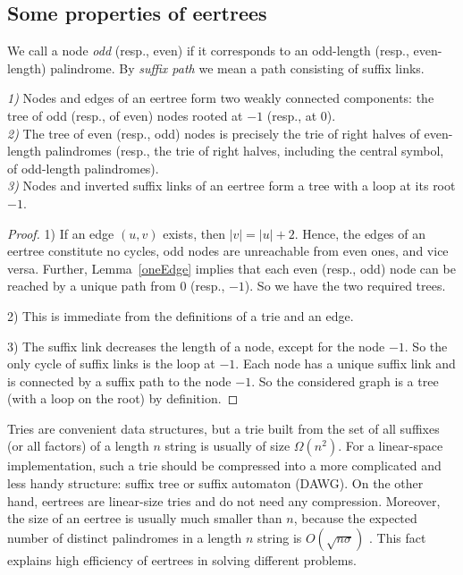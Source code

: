 \documentclass{llncs}
\begin{document}
\subsection{Some properties of eertrees} \label{ssec:prop}

We call a node \emph{odd} (resp., even) if it corresponds to an odd-length (resp., even-length) palindrome. By \emph{suffix path} we mean a path consisting of suffix links. 

\begin{lemma}\label{twotree}
\emph{1)} Nodes and edges of an eertree form two weakly connected components: the tree of odd (resp., of even) nodes rooted at $-1$ (resp., at $0$).\\
\emph{2)} The tree of even (resp., odd) nodes is precisely the trie of right halves of even-length palindromes (resp., the trie of right halves, including the central symbol, of odd-length palindromes).\\
\emph{3)} Nodes and inverted suffix links of an eertree form a tree with a loop at its root $-1$.
\end{lemma}

\begin{proof}
1) If an edge $(u,v)$ exists, then $|v|=|u|+2$. Hence, the edges of an eertree constitute no cycles, odd nodes are unreachable from even ones, and vice versa. Further, Lemma~\ref{oneEdge} implies that each even (resp., odd) node can be reached by a unique path from $0$ (resp., $-1$). So we have the two required trees.

2) This is immediate from the definitions of a trie and an edge.

3) The suffix link decreases the length of a node, except for the node $-1$. So the only cycle of suffix links is the loop at $-1$. Each node has a unique suffix link and is connected by a suffix path to the node $-1$. So the considered graph is a tree (with a loop on the root) by definition. 
\end{proof}



\begin{remark}
Tries are convenient data structures, but a trie built from the set of all suffixes (or all factors) of a length $n$ string is usually of size $\Omega(n^2)$. For a linear-space implementation, such a  trie should be compressed into a more complicated and less handy structure: suffix tree or suffix automaton (DAWG). On the other hand, eertrees are linear-size tries and do not need any compression. Moreover, the size of an eertree is usually much smaller than $n$, because the expected number of distinct palindromes in a length $n$ string is $O(\sqrt{n\sigma})$ \cite{RuSh15}. This fact explains high efficiency of eertrees in solving different problems.
\end{remark}
\end{document}
